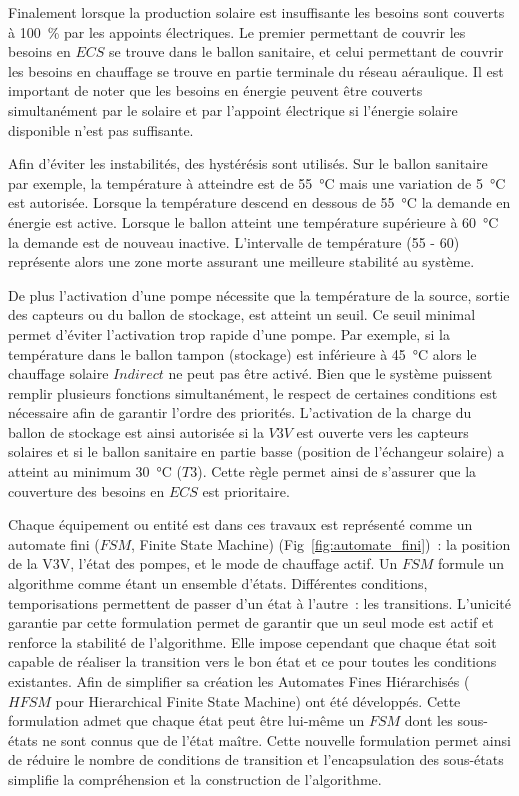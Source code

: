 Finalement lorsque la production solaire est insuffisante les besoins sont couverts à
\SI{100}{\percent} par les appoints électriques. Le premier permettant de couvrir les
besoins en $ECS$ se trouve dans le ballon sanitaire, et celui permettant de couvrir les
besoins en chauffage se trouve en partie terminale du réseau aéraulique. Il est important
de noter que les besoins en énergie peuvent être couverts simultanément par
le solaire et par l’appoint électrique si l’énergie solaire disponible n’est pas
suffisante.

Afin d’éviter les instabilités, des hystérésis sont utilisés. Sur le ballon sanitaire par
exemple, la température à atteindre est de \SI{55}{\celsius} mais une variation de
\SI{5}{\celsius} est autorisée. Lorsque la température descend en dessous de
\SI{55}{\celsius} la demande en énergie est active. Lorsque le ballon atteint une
température supérieure à \SI{60}{\celsius} la demande est de nouveau inactive.
L’intervalle de température (55 - 60) représente alors une zone morte assurant une
meilleure stabilité au système.

De plus l’activation d’une pompe nécessite que la température de la source, sortie des
capteurs ou du ballon de stockage, est atteint un seuil. Ce seuil minimal permet d’éviter
l’activation trop rapide d’une pompe. Par exemple, si la température dans le ballon tampon
(stockage) est inférieure à \SI{45}{\celsius} alors le chauffage solaire $Indirect$ ne
peut pas être activé. Bien que le système puissent remplir plusieurs fonctions
simultanément, le respect de certaines conditions est nécessaire afin de garantir l’ordre
des priorités. L’activation de la charge du ballon de stockage est ainsi autorisée si la
$V3V$ est ouverte vers les capteurs solaires et si le ballon sanitaire en partie
basse (position de l’échangeur solaire) a atteint au minimum \SI{30}{\celsius} ($T3$). Cette
règle permet ainsi de s’assurer que la couverture des besoins en $ECS$ est prioritaire.

Chaque équipement ou entité est dans ces travaux est représenté comme un automate fini
($FSM$, Finite State Machine) (Fig~\ref{fig:automate_fini})~: la position de la V3V,
l’état des pompes, et le mode de chauffage actif. Un $FSM$ formule un algorithme comme
étant un ensemble d’états. Différentes conditions, temporisations permettent de passer
d’un état à l’autre~: les transitions. L’unicité garantie par cette formulation permet de
garantir que un seul mode est actif et renforce la stabilité de l’algorithme. Elle impose
cependant que chaque état soit capable de réaliser la transition vers le bon état et ce
pour toutes les conditions existantes. Afin de simplifier sa création les Automates Fines
Hiérarchisés ($HFSM$ pour Hierarchical Finite State Machine) ont été développés. Cette
formulation admet que chaque état peut être lui-même un $FSM$ dont les sous-états ne sont
connus que de l’état maître. Cette nouvelle formulation permet ainsi de réduire le nombre
de conditions de transition et l’encapsulation des sous-états simplifie la compréhension
et la construction de l’algorithme.

